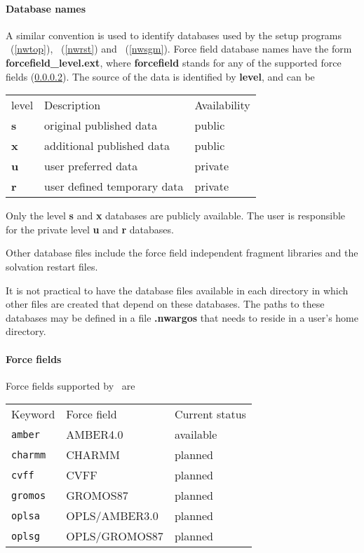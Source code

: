 \paragraph{Database names}
\par
A similar convention is used to identify databases used by the setup programs
\nwtop\ (\ref{nwtop}), \nwrst\ (\ref{nwrst}) and \nwsgm\ (\ref{nwsgm}).
Force field database names have the form
{\bf forcefield\_level.ext}, where {\bf forcefield} stands for any of the
supported force fields (\ref{forcefields}). The source
of the data is identified by {\bf level}, and can be 
\begin{center}
\begin{tabular}{lll}
\hline
level   & Description                 & Availability \\
{\bf s} & original published data     & public       \\
{\bf x} & additional published data   & public       \\
{\bf u} & user preferred data         & private      \\
{\bf r} & user defined temporary data & private    \\
\hline
\end{tabular}
\end{center}
\par
Only the level {\bf s} and {\bf x} databases are publicly available. 
The user is responsible for the private level {\bf u} and {\bf r} databases.
\par
Other database files include the force field independent fragment libraries 
and the solvation restart files.
\par
It is not practical to have the database files available in each directory
in which other files are created that depend on these databases. The paths
to these databases may be defined in a file {\bf .nwargos} that needs to
reside in a user's home directory.
\paragraph{Force fields}
\label{forcefields}
Force fields supported by \nwargos\ are
\begin{center}
\begin{tabular}{lll}
\hline
Keyword      & Force field   & Current status \\
{\tt amber}  & AMBER4.0      & available      \\
{\tt charmm} & CHARMM        & planned        \\
{\tt cvff}   & CVFF          & planned        \\
{\tt gromos} & GROMOS87      & planned        \\
{\tt oplsa}  & OPLS/AMBER3.0 & planned        \\
{\tt oplsg}  & OPLS/GROMOS87 & planned        \\
\hline
\end{tabular}
\end{center}  
